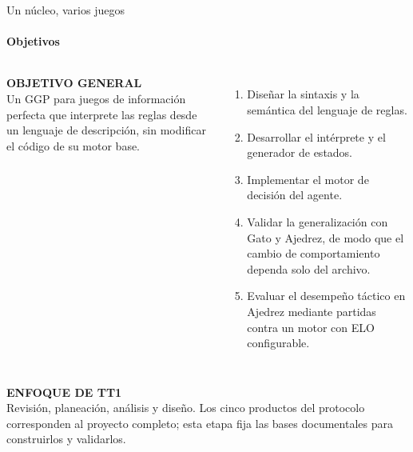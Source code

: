 \documentclass[aspectratio=169,10pt,t]{beamer}
\begin{document}
\begin{frame}{Un núcleo, varios juegos}
\framesubtitle{Objetivos}
\begin{columns}[T]
\begin{banda}
{\scriptsize\bfseries\color{vinoclaro} OBJETIVO GENERAL}\\[3pt]
\small Un GGP para juegos de información perfecta que interprete las reglas desde un lenguaje de descripción, sin modificar el código de su motor base.
\end{banda}
\small
\begin{enumerate}
\setlength\itemsep{3pt}
\item Diseñar la sintaxis y la semántica del lenguaje de reglas.
\item Desarrollar el intérprete y el generador de estados.
\item Implementar el motor de decisión del agente.
\item Validar la generalización con Gato y Ajedrez, de modo que el cambio de comportamiento dependa solo del archivo.
\item Evaluar el desempeño táctico en Ajedrez mediante partidas contra un motor con ELO configurable.
\end{enumerate}
\end{columns}
\vspace{4pt}
\begin{tarjeta}[azulp]
{\scriptsize\bfseries ENFOQUE DE TT1}\\[1pt]
Revisión, planeación, análisis y diseño. Los cinco productos del protocolo corresponden al proyecto completo; esta etapa fija las bases documentales para construirlos y validarlos.
\end{tarjeta}
\end{frame}
\end{document}
